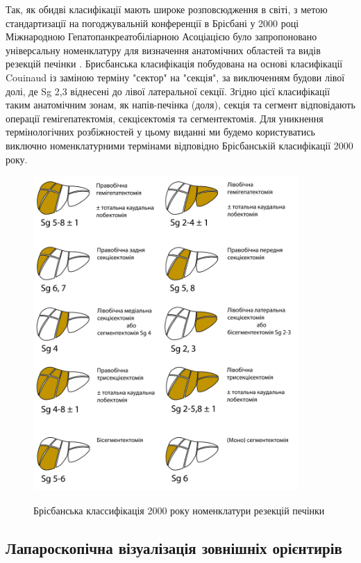 \begin{refsection}
Так, як обидві класифікації мають широке розповсюдження в світі, з метою стандартизації на погоджувальній конференції в Брісбані у 2000 році Міжнародною Гепатопанкреатобіліарною Асоціацією було запропоновано універсальну номенклатуру для визначення анатомічних областей та видів резекцій печінки \cite{Pang2000}. Брисбанська класифікація побудована на основі класифікації Couinaud із заміною терміну "сектор" на "секція", за виключенням будови лівої долі, де Sg 2,3 віднесені до лівої латеральної секції. Згідно цієї класифікації таким анатомічним зонам, як напів-печінка (доля), секція та сегмент відповідають операції гемігепатектомія, секцієектомія та сегментектомія. Для уникнення термінологічних розбіжностей у цьому виданні ми будемо користуватись виключно номенклатурними термінами відповідно Брісбанській класифікації 2000 року.

\begin{figure}[h]
\caption{Брісбанська классифікація 2000 року номенклатури резекцій печінки}
\centering
\includegraphics[width=0.9\textwidth]{Illustrations/Chapter_01/Brisbane.jpg}
\label{fig:Brisbane}
\end{figure}

\subsection{Лапароскопічна візуалізація зовнішніх орієнтирів}


\end{refsection}

